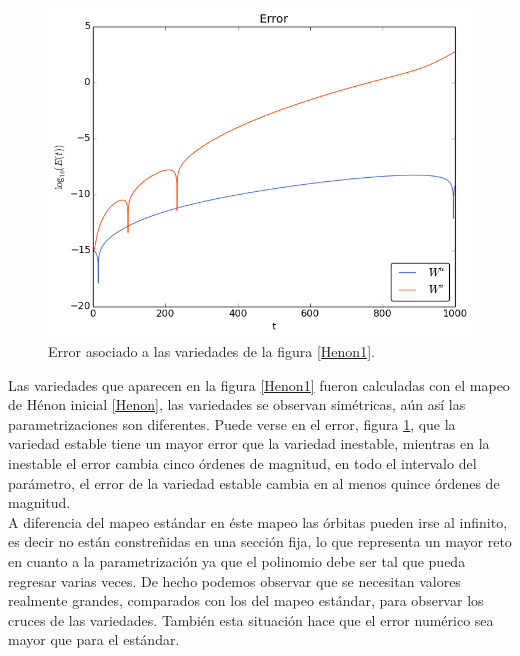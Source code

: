 \begin{figure}[H]
\centering
\includegraphics[scale=0.6]{ErrorHenon1}
\caption{Error asociado a las variedades de la figura \ref{Henon1}.}
\label{ErrorHenon1}
\end{figure}
Las variedades que aparecen en la figura \ref{Henon1} fueron calculadas con el mapeo de Hénon inicial \eqref{Henon}, las variedades se observan simétricas, aún así las parametrizaciones son diferentes. Puede verse en el error, figura \ref{ErrorHenon1}, que la variedad estable tiene un mayor error que la variedad inestable, mientras en la inestable el error cambia cinco órdenes de magnitud, en todo el intervalo del parámetro, el error de la variedad estable cambia en al menos quince órdenes de magnitud. \\

A diferencia del mapeo estándar en éste mapeo las órbitas pueden irse al infinito, es decir no están  constreñidas en una sección fija, lo que representa un mayor reto en cuanto a la parametrización ya que el polinomio debe ser tal que pueda regresar varias veces. De hecho podemos observar que se necesitan valores realmente grandes, comparados con los del mapeo estándar, para observar los cruces de las variedades. También esta situación hace que el error numérico sea mayor que para el estándar. \\

